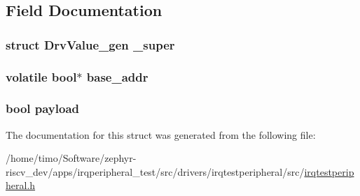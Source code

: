 \subsection{Field Documentation}
\subsubsection[{\texorpdfstring{\+\_\+super}{_super}}]{\setlength{\rightskip}{0pt plus 5cm}struct {\bf Drv\+Value\+\_\+gen} \+\_\+super}\hypertarget{struct_drv_value__bool_ad6a22febddaa20faa4af2f9fed5766f0}{}\label{struct_drv_value__bool_ad6a22febddaa20faa4af2f9fed5766f0}
\subsubsection[{\texorpdfstring{base\+\_\+addr}{base_addr}}]{\setlength{\rightskip}{0pt plus 5cm}volatile bool$\ast$ base\+\_\+addr}\hypertarget{struct_drv_value__bool_af9a44b0b9251fbefd04c475aaab792ad}{}\label{struct_drv_value__bool_af9a44b0b9251fbefd04c475aaab792ad}
\subsubsection[{\texorpdfstring{payload}{payload}}]{\setlength{\rightskip}{0pt plus 5cm}bool payload}\hypertarget{struct_drv_value__bool_abdbaaae567d94da3de1d6aa546b501ac}{}\label{struct_drv_value__bool_abdbaaae567d94da3de1d6aa546b501ac}


The documentation for this struct was generated from the following file\+:\begin{DoxyCompactItemize}
\item 
/home/timo/\+Software/zephyr-\/riscv\+\_\+dev/apps/irqperipheral\+\_\+test/src/drivers/irqtestperipheral/src/\hyperlink{irqtestperipheral_8h}{irqtestperipheral.\+h}\end{DoxyCompactItemize}
